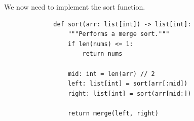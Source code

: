 \documentclass[11pt]{article}
\begin{document}
We now need to implement the sort function.


\begin{figure}[H]
    \centering
    \begin{verbatim}
        def sort(arr: list[int]) -> list[int]:
            """Performs a merge sort."""
            if len(nums) <= 1:
                return nums
            
            mid: int = len(arr) // 2
            left: list[int] = sort(arr[:mid])
            right: list[int] = sort(arr[mid:])

            return merge(left, right)
    \end{verbatim}
\end{figure}

\end{document}
